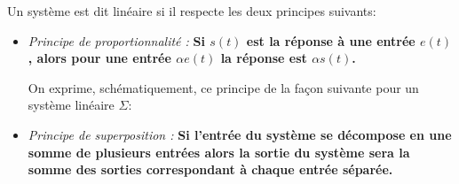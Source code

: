 Un système est dit linéaire si il respecte les deux principes suivants:

\begin{itemize}
    \item \emph{Principe de proportionnalité :}
          \textbf{Si $s(t)$ est la réponse à une entrée $e(t)$, alors 
          pour une entrée $\alpha e(t)$ la réponse est $\alpha s(t)$.}
        
    On exprime, schématiquement, ce principe de la façon suivante pour 
    un système linéaire $\Sigma$:
    \begin{center}
    {\tikzset{external/export=false}
    }
    \end{center}


    \item \emph{Principe de superposition :}
     \textbf{Si l'entrée du système se décompose en une somme 
        de plusieurs entrées alors la sortie du système sera la somme des 
        sorties correspondant à chaque entrée séparée.}


\end{itemize}
